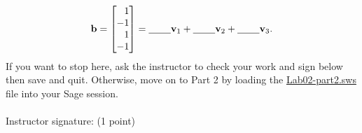 \documentclass[fleqn,11pt]{paper}
\theoremstyle{remark}
\renewcommand{\vec}[1]{\mathbf{#1}}
\newcommand{\<}{\ensuremath{\langle}}
\renewcommand{\>}{\ensuremath{\rangle}}
\newcommand\vb{\vec{b}}
\newcommand\vv{\vec{v}}
\begin{document}
\vskip5mm
\[
  \vb = \begin{bmatrix*}[r] 1 \\ -1 \\ 1 \\ -1\end{bmatrix*}= \text{\underline{\phantom{XXX}}}\vv_1 + \text{\underline{\phantom{XXX}}} \vv_2+
\text{\underline{\phantom{XXX}}} \vv_3.
\]
\vskip5mm
\noindent  If you want to stop here, ask the instructor to check your work and sign below
then save and quit. Otherwise, move on to Part 2 by loading the \href{https://github.com/williamdemeo/Math317-Spring2016/raw/master/computerlab/Lab02-part2.sws}{Lab02-part2.sws} file into your 
Sage session.
    \\\\
    Instructor signature: \underline{\phantom{XXXXXXXXXXXXXXXXXXXXXXXXXXXXXXXX}} (1 point)
\end{document}
